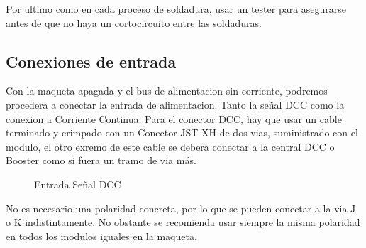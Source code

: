 \documentclass{DccDiyTools}
\begin{document}
Por ultimo como en cada proceso de soldadura, usar un tester para asegurarse antes de que no haya un cortocircuito
entre las soldaduras.
\subsection{Conexiones de entrada}
Con la maqueta apagada y el bus de alimentacion sin corriente, podremos procedera a conectar la entrada de alimentacion.
Tanto la señal DCC como la conexion a Corriente Continua. Para el conector DCC, hay que usar un cable terminado y 
crimpado con un Conector JST XH de dos vias, suministrado con el modulo, el otro exremo de este cable se debera conectar
a la central DCC o Booster como si fuera un tramo de via más.

\begin{figure}[H]
    \centering
    \caption{Entrada Señal DCC}
    \label{fig:DccIn}
\end{figure}
No es necesario una polaridad concreta, por lo que se pueden conectar a la via J o K indistintamente. No obstante se 
recomienda usar siempre la misma polaridad en todos los modulos iguales en la maqueta.
\end{document}
